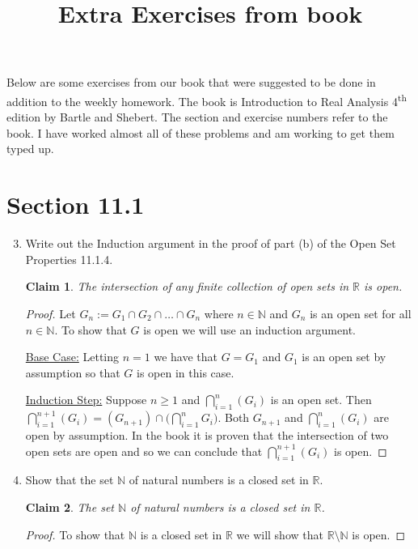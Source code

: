 \documentclass[12pt]{article}
\title{Extra Exercises from book}
\newtheorem*{claim}{Claim}
\begin{document}
\maketitle

Below are some exercises from our book that were suggested to be done in addition to the weekly homework. The book is Introduction to Real Analysis 4\textsuperscript{th} edition by Bartle and Shebert. The section and exercise numbers refer to the book. I have worked almost all of these problems and am working to get them typed up.

\section*{Section 11.1}

\begin{enumerate}[label=\arabic*., itemsep=1.5cm]

\setcounter{enumi}{2}

\item Write out the Induction argument in the proof of part (b) of the Open Set Properties 11.1.4.

\vspace{0.5cm}

\begin{claim}
The intersection of any finite collection of open sets in $\mathbb{R}$ is open.
\end{claim}

\begin{proof}
Let $G_n := G_1 \cap G_2 \cap \ldots \cap G_n$ where $n \in \mathbb{N}$ and $G_n$ is an open set for all $n \in \mathbb{N}$. To show that $G$ is open we will use an induction argument.

\underline{Base Case:} Letting $n = 1$ we have that $G = G_1$ and $G_1$ is an open set by assumption so that $G$ is open in this case.

\underline{Induction Step:} Suppose $n \geq 1$ and $\displaystyle \bigcap_{i = 1}^{n} (G_i)$ is an open set. Then $\displaystyle \bigcap_{i = 1}^{n + 1} (G_i) = (G_{n + 1}) \cap \bigg( \bigcap_{i = 1}^{n} G_i \bigg)$. Both $G_{n + 1}$ and $\displaystyle \bigcap_{i = 1}^{n} (G_i)$ are open by assumption. In the book it is proven that the intersection of two open sets are open and so we can conclude that $\displaystyle \bigcap_{i = 1}^{n + 1} (G_i)$ is open.
\end{proof}

\setcounter{enumi}{4}

\item Show that the set $\mathbb{N}$ of natural numbers is a closed set in $\mathbb{R}$.

\vspace{0.5cm}

\begin{claim}
The set $\mathbb{N}$ of natural numbers is a closed set in $\mathbb{R}$.
\end{claim}

\begin{proof}
To show that $\mathbb{N}$ is a closed set in $\mathbb{R}$ we will show that $\mathbb{R} \setminus \mathbb{N}$ is open.
\end{proof}

\end{enumerate}
\end{document}
